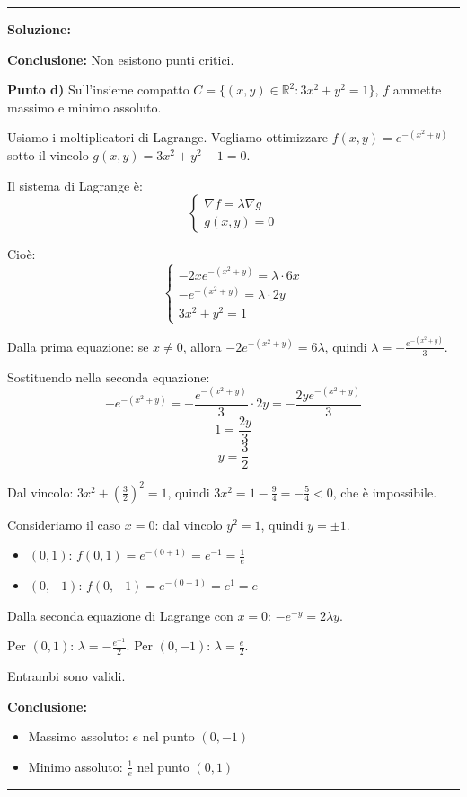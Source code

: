 \documentclass[12pt, a4paper]{article}
\newenvironment{solution}
{\par\noindent\rule{\textwidth}{0.4pt}\par\textbf{Soluzione:}\medskip\par}
{\par\rule{\textwidth}{0.4pt}\par\bigskip}
\begin{document}
\begin{solution}
\textbf{Conclusione:} Non esistono punti critici.

\vspace{0.5cm}

\textbf{Punto d)} Sull'insieme compatto $C = \{(x,y) \in \mathbb{R}^2 : 3x^2 + y^2 = 1\}$, $f$ ammette massimo e minimo assoluto.

Usiamo i moltiplicatori di Lagrange. Vogliamo ottimizzare $f(x,y) = e^{-(x^{2}+y)}$ sotto il vincolo $g(x,y) = 3x^2 + y^2 - 1 = 0$.

Il sistema di Lagrange è:
\[
\begin{cases}
\nabla f = \lambda \nabla g \\
g(x,y) = 0
\end{cases}
\]

Cioè:
\[
\begin{cases}
-2xe^{-(x^{2}+y)} = \lambda \cdot 6x \\
-e^{-(x^{2}+y)} = \lambda \cdot 2y \\
3x^2 + y^2 = 1
\end{cases}
\]

Dalla prima equazione: se $x \neq 0$, allora $-2e^{-(x^{2}+y)} = 6\lambda$, quindi $\lambda = -\frac{e^{-(x^{2}+y)}}{3}$.

Sostituendo nella seconda equazione:
\[
-e^{-(x^{2}+y)} = -\frac{e^{-(x^{2}+y)}}{3} \cdot 2y = -\frac{2ye^{-(x^{2}+y)}}{3}
\]
\[
1 = \frac{2y}{3}
\]
\[
y = \frac{3}{2}
\]

Dal vincolo: $3x^2 + \left(\frac{3}{2}\right)^2 = 1$, quindi $3x^2 = 1 - \frac{9}{4} = -\frac{5}{4} < 0$, che è impossibile.

Consideriamo il caso $x = 0$: dal vincolo $y^2 = 1$, quindi $y = \pm 1$.

\begin{itemize}
    \item $(0, 1)$: $f(0, 1) = e^{-(0 + 1)} = e^{-1} = \frac{1}{e}$
    \item $(0, -1)$: $f(0, -1) = e^{-(0 - 1)} = e^{1} = e$
\end{itemize}

Dalla seconda equazione di Lagrange con $x = 0$: $-e^{-y} = 2\lambda y$.

Per $(0, 1)$: $\lambda = -\frac{e^{-1}}{2}$.
Per $(0, -1)$: $\lambda = \frac{e}{2}$.

Entrambi sono validi.

\textbf{Conclusione:}
\begin{itemize}
    \item Massimo assoluto: $e$ nel punto $(0, -1)$
    \item Minimo assoluto: $\frac{1}{e}$ nel punto $(0, 1)$
\end{itemize}
\end{solution}
\end{document}
